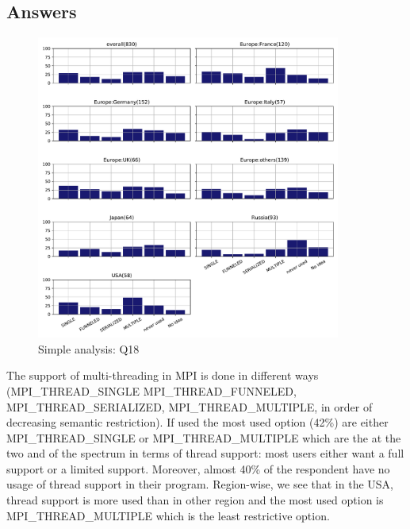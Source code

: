 
\subsection{Answers}



\begin{figure}[htb]
\begin{center}
\includegraphics[width=10cm]{../pdfs/Q18.pdf}
\caption{Simple analysis: Q18}
\label{fig:Q18}
\end{center}
\end{figure}

The support of multi-threading in MPI is done in different ways (MPI\_THREAD\_SINGLE
MPI\_THREAD\_FUNNELED, MPI\_THREAD\_SERIALIZED, MPI\_THREAD\_MULTIPLE, in order of
decreasing semantic restriction). If used the most used option (42\%) are either
MPI\_THREAD\_SINGLE or MPI\_THREAD\_MULTIPLE which are the at the two and of the
spectrum in terms of thread support: most users either want a full support or a
limited support. Moreover, almost 40\% of the respondent have no usage of thread
support in their program. Region-wise, we see that in the USA, thread support is more used
than in other region and the most used option is MPI\_THREAD\_MULTIPLE which is
the least restrictive option. 

